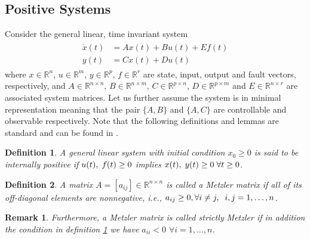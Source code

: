 \documentclass[letterpaper, 10 pt, conference]{ieeeconf}  %
\newtheorem{definition}{Definition}
\newtheorem{remark}{Remark}
\def\gez{\geq 0}
\newcommand{\ie}{\textit{i}.\textit{e}., }
\begin{document}
\subsection{Positive Systems}
Consider the general linear, time invariant system
\begin{gather}\label{eq: xdot}
\begin{aligned} 
\dot{x}(t) &= Ax(t) + Bu(t) + Ef(t)  \\
y(t) &= Cx(t) + Du(t)
\end{aligned}
\end{gather}
where $x \in \mathbb{R}^n$, $u \in \mathbb{R}^m$, $y \in \mathbb{R}^p$, $f \in \mathbb{R}^r$ are state, input, output and fault vectors, respectively, and $A \in \mathbb{R}^{n \times n}$, $B \in \mathbb{R}^{n \times m}$, $C \in \mathbb{R}^{p \times n}$, $D \in \mathbb{R}^{p \times m}$ and $E \in \mathbb{R}^{n \times r}$ are associated system matrices. Let us further assume the system is in minimal representation meaning that the pair $\{A,B\}$ and $\{A,C\}$ are controllable and observable respectively. Note that the following definitions and lemmas are standard and can be found in \cite{farina_positive_2000}. 

\begin{definition} \label{def:Metz}
A general linear system with initial condition $x_0 \gez$ is said to be internally positive if $u(t), \hspace{1mm} f(t) \gez$ implies $x(t), \hspace{1mm} y(t) \gez \hspace{1mm}\forall t \gez$.
\end{definition}

\begin{definition} A matrix $A = [a_{ij}] \in \mathbb{R}^{n \times n}$ is called a Metzler matrix if all of its off-diagonal elements are nonnegative, \ie $a_{ij} \geq 0, \forall i \neq j,\hspace{2mm} i,j = 1, \ldots , n$.  
\end{definition}

\begin{remark} \label{rem:rem1}
Furthermore, a Metzler matrix is called strictly Metzler if in addition the condition in definition \ref{def:Metz} we have $a_{ii} < 0$ $\forall i = 1,\ldots,n$. 
\end{remark}
\end{document}
